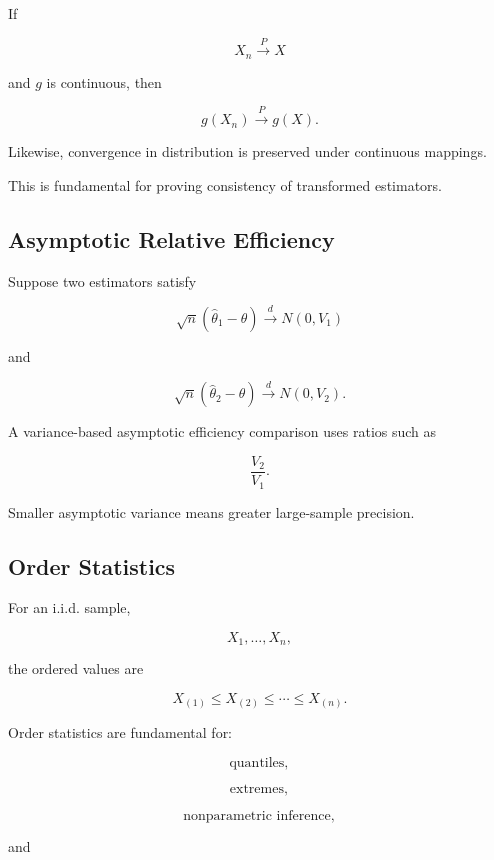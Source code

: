If

\[
X_n
\xrightarrow{P}
X
\]

and \(g\) is continuous, then

\[
\boxed{
g(X_n)
\xrightarrow{P}
g(X).
}
\]

Likewise, convergence in distribution is preserved under continuous
mappings.

This is fundamental for proving consistency of transformed estimators.

\subsection{Asymptotic Relative Efficiency}
\label{subsec:asymptotic-relative-efficiency-mathstat}

Suppose two estimators satisfy

\[
\sqrt{n}
(
\widehat{\theta}_1-\theta
)
\xrightarrow{d}
N(0,V_1)
\]

and

\[
\sqrt{n}
(
\widehat{\theta}_2-\theta
)
\xrightarrow{d}
N(0,V_2).
\]

A variance-based asymptotic efficiency comparison uses ratios such as

\[
\boxed{
\frac{
V_2
}{
V_1
}.
}
\]

Smaller asymptotic variance means greater large-sample precision.

\subsection{Order Statistics}
\label{subsec:order-statistics-mathstat}

For an i.i.d. sample,

\[
X_1,\ldots,X_n,
\]

the ordered values are

\[
\boxed{
X_{(1)}
\leq
X_{(2)}
\leq
\cdots
\leq
X_{(n)}.
}
\]

Order statistics are fundamental for:

\[
\boxed{
\text{quantiles},
}
\]

\[
\boxed{
\text{extremes},
}
\]

\[
\boxed{
\text{nonparametric inference},
}
\]

and

